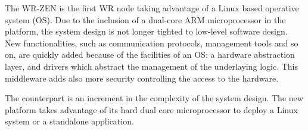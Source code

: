 %

The WR-ZEN is the first WR node taking advantage of a Linux 
based operative system (OS). Due to the inclusion of a dual-core ARM 
microprocessor in the platform, the system design is not longer tighted to 
low-level software design. New functionalities, such as communication 
protocols, management tools and so on, are quickly added because of the 
facilities of an OS: a hardware abstraction layer, and drivers which abstract 
the management of the underlaying logic. This middleware adds also more 
security controlling the access to the hardware.

The counterpart is an increment in the complexity of the system design. The new platform takes advantage of its hard dual core microprocessor to deploy a Linux system or a standalone application.

